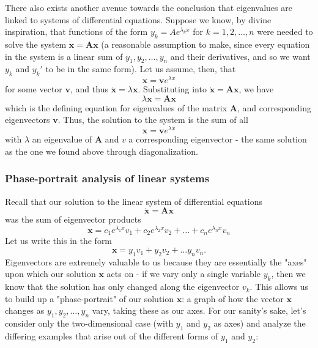 \documentclass{article}
\begin{document}
There also exists another avenue towards the conclusion that eigenvalues are linked to systems of differential equations. Suppose we know, by divine inspiration, that functions of the form $y_k=Ae^{\lambda_k x}$ for $k=1,2,\dots,n$ were needed to solve the system $\dot{\mathbf{x}} = \mathbf{A}\mathbf{x}$ (a reasonable assumption to make, since every equation in the system is a linear sum of $y_1, y_2, \dots, y_n$ and their derivatives, and so we want $y_k$ and $y_k'$ to be in the same form). Let us assume, then, that 
\begin{equation*}
    \mathbf{x} = \mathbf{v}e^{\lambda x}
\end{equation*}
for some vector $\mathbf{v}$, and thus $\mathbf{\dot{x}} = \lambda \mathbf{x}$. Substituting into $\mathbf{\dot{x}} = \mathbf{Ax}$, we have 
\begin{equation*}
    \lambda \mathbf{x} = \mathbf{Ax}
\end{equation*}
which is the defining equation for eigenvalues of the matrix $\mathbf{A}$, and corresponding eigenvectors $\mathbf{v}$. Thus, the solution to the system is the sum of all
\begin{equation*}
    \mathbf{x} = \mathbf{v}e^{\lambda x}
\end{equation*}
with $\lambda$ an eigenvalue of $\mathbf{A}$ and $v$ a corresponding eigenvector - the same solution as the one we found above through diagonalization.
\subsubsection{Phase-portrait analysis of linear systems}
Recall that our solution to the linear system of differential equations 
\begin{equation*}
    \mathbf{\dot{x}} = \mathbf{Ax}
\end{equation*}
was the sum of eigenvector products
\begin{equation*}
    \mathbf{x}=c_1e^{\lambda_1 x }v_1 + c_2e^{\lambda_2 x}v_2 + \dots + c_ne^{\lambda_n x}v_n
\end{equation*}
Let us write this in the form 
\begin{equation*}
    \mathbf{x} =y_1v_1 + y_2 v_2 + \dots y_n v_n.
\end{equation*}
Eigenvectors are extremely valuable to us because they are essentially the "axes" upon which our solution $\mathbf{x}$ acts on - if we vary only a single variable $y_k$, then we know that the solution has only changed along the eigenvector $v_k$. This allows us to build up a "phase-portrait" of our solution $\mathbf{x}$: a graph of how the vector $\mathbf{x}$ changes as $y_1, y_2, \dots, y_n$ vary, taking these as our axes. For our sanity's sake, let's consider only the two-dimensional case (with $y_1$ and $y_2$ as axes) and analyze the differing examples that arise out of the different forms of $y_1$ and $y_2$:
\end{document}
